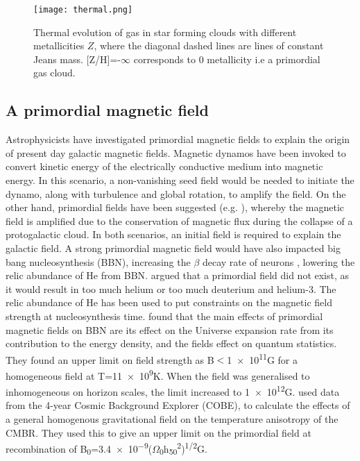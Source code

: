 \documentclass[11pt]{article}
\begin{document}
\begin{figure}[h!]
         \centering
		\texttt{[image: thermal.png]}
		\caption{Thermal evolution of gas in star forming clouds with different metallicities $Z$, where the diagonal dashed lines are lines of constant Jeans mass. [Z/H]=-$\infty$ corresponds to 0 metallicity i.e a primordial gas cloud. \citep{Omukai2005} }
		\label{fig:thermal}
\end{figure}





\subsection{A primordial magnetic field}
\label{sub:Bfield}
Astrophysicists have investigated primordial magnetic fields to explain the origin of present day galactic magnetic fields. Magnetic dynamos \citep{Vainshtein1980} have been invoked to convert kinetic energy of the electrically conductive medium into magnetic energy. In this scenario, a non-vanishing seed field would be needed to initiate the dynamo, along with turbulence and global rotation, to amplify the field. On the other hand, primordial fields have been suggested (e.g. \citealt{Kulsrud1990}), whereby the magnetic field is amplified due to the conservation of magnetic flux during the collapse of a protogalactic cloud. In both scenarios, an initial field is required to explain the galactic field. A strong primordial magnetic field would have also impacted big bang nucleosynthesis (BBN), increasing the $\beta$ decay rate of neurons \citep{Matese1969}, lowering the relic abundance of He from BBN.  \cite{Greenstein1969} argued that a primordial field did not exist, as it would result in too much helium or too much deuterium and helium-3. The relic abundance of He has been used to put constraints on the magnetic field strength at nucleosynthesis time. \cite{Grasso1996} found that the main effects of primordial magnetic fields on BBN are its effect on the Universe expansion rate from its contribution to the energy density, and the fields effect on quantum statistics. They found an upper limit on field strength as B$<$\num{1e11}G for a homogeneous field at T=1\num{1e9}K. When the field was generalised to inhomogeneous on horizon scales, the limit increased to \num{1e12}G.
\cite{Barrow1997} used data from the 4-year Cosmic Background Explorer (COBE), to calculate the effects of a general homogenous gravitational field on the temperature anisotropy of the CMBR. They used this to give an upper limit on the primordial field at recombination of B\textsubscript{0}=\num{3.4e-9}($\Omega$\textsubscript{0}h\textsubscript{50}\textsuperscript{2})\textsuperscript{1/2}G.
\end{document}
